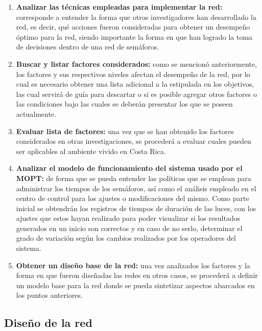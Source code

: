 \begin{enumerate}
  \item \textbf{Analizar las t\'{e}cnicas empleadas para implementar la red:}
  corresponde a entender la forma que otros investigadores han desarrollado
  la red, es decir, qu\'{e} acciones fueron consideradas para obtener un
  desempe\~{n}o \'{o}ptimo para la red, siendo importante la forma en
  que han logrado la toma de decisiones dentro de una red de
  sem\'{a}foros.
  
  \item \textbf{Buscar y listar factores considerados:} como se mencion\'{o}
  anteriormente, los factores y sus respectivos niveles afectan el desempe\~{n}o
  de la red, por lo cual es necesario obtener una lista adicional a la
  estipulada en los objetivos, las cual servir\'{a} de gu\'{i}a para descartar o
  si es posible agregar otros factores o las condiciones bajo las cuales se
  deber\'{a}n presentar los que se poseen actualmente.
  
  \item \textbf{Evaluar lista de factores:} una vez que se han obtenido los
  factores considerados en otras investigaciones, se proceder\'{a} a evaluar
  cuales pueden ser aplicables al ambiente vivido en Costa Rica.
  
  \item \textbf{Analizar el modelo de funcionamiento del sistema usado por el
  MOPT:} de forma que se pueda entender las pol\'{i}ticas que se emplean para
  administrar los tiempos de los sem\'{a}foros, as\'{i} como el an\'{a}lisis
  empleado en el centro de control para los ajustes o modificaciones del mismo.
  Como parte inicial se obtendr\'{a}n los registros de tiempos de duraci\'{o}n
  de las luces, con los ajustes que estos hayan realizado para poder visualizar
  si los resultados generados en un inicio son correctos y en caso de no serlo,
  determinar el grado de variaci\'{o}n seg\'{u}n los cambios realizados por los
  operadores del sistema.
  
  \item \textbf{Obtener un dise\~{n}o base de la red:} una vez analizados los
  factores y la forma en que fueron dise\~{n}adas las redes en otros casos, se
  proceder\'{a} a definir un modelo base para la red donde se pueda sintetizar
  aspectos abarcados en los puntos anteriores.
\end{enumerate}

\subsection{Dise\~{n}o de la red}
